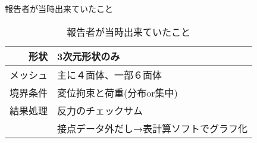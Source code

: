 \begin{frame}{報告者が当時出来ていたこと}
  \begin{table}[hbtp]
      \caption{報告者が当時出来ていたこと}
      \begin{tabular}{|r|l|} %
          \hline
          形状     & 3次元形状のみ \rule[0mm]{0mm}{7mm} \\
          \hline
          メッシュ & 主に４面体、一部６面体 \rule[0mm]{0mm}{7mm} \\
          \hline
          境界条件 & 変位拘束と荷重(分布or集中) \rule[0mm]{0mm}{7mm} \\
          \hline
          結果処理 & 反力のチェックサム \rule[0mm]{0mm}{7mm} \\
                   & 接点データ外だし→表計算ソフトでグラフ化\\
          \hline
    \end{tabular}
  \end{table}
\end{frame}
